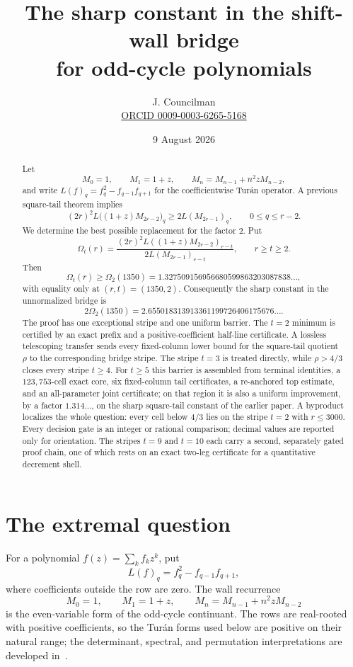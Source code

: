 \documentclass[11pt,a4paper]{article}
\title{\textbf{The sharp constant in the shift-wall bridge\\
for odd-cycle polynomials}}
\author{J. Councilman\\
\small\href{https://orcid.org/0009-0003-6265-5168}{ORCID 0009-0003-6265-5168}}
\date{9 August 2026}
\theoremstyle{plain}
\theoremstyle{remark}
\begin{document}
\maketitle

\begin{abstract}
Let
\[
 M_0=1,\qquad M_1=1+z,\qquad
 M_n=M_{n-1}+n^2zM_{n-2},
\]
and write $L(f)_q=f_q^2-f_{q-1}f_{q+1}$ for the coefficientwise
Tur\'an operator.  A previous square-tail theorem implies
\[
 (2r)^2L\bigl((1+z)M_{2r-2}\bigr)_q\ge 2L(M_{2r-1})_q,
 \qquad 0\le q\le r-2.
\]
We determine the best possible replacement for the factor $2$.  Put
\[
 \Omega_t(r)=
 \frac{(2r)^2L((1+z)M_{2r-2})_{r-t}}
      {2L(M_{2r-1})_{r-t}},\qquad r\ge t\ge2.
\]
Then
\[
 \Omega_t(r)\ge \Omega_2(1350)
 =1.327509156956680599863203087838\ldots,
\]
with equality only at $(r,t)=(1350,2)$.  Consequently the sharp constant in
the unnormalized bridge is
\[
 2\Omega_2(1350)
 =2.655018313913361199726406175676\ldots.
\]
The proof has one exceptional stripe and one uniform barrier.  The $t=2$
minimum is certified by an exact prefix and a positive-coefficient half-line
certificate.  A lossless telescoping transfer sends every fixed-column lower
bound for the square-tail quotient $\rho$ to the corresponding bridge stripe.
The stripe $t=3$ is treated directly, while $\rho>4/3$ closes every stripe
$t\ge4$.  For $t\ge5$ this barrier is assembled from terminal identities, a
$123{,}753$-cell exact core, six fixed-column tail certificates, a re-anchored
top estimate, and an all-parameter joint certificate; on that region it is
also a uniform improvement, by a factor $1.314\ldots$, on the sharp
square-tail constant of the earlier paper.  A byproduct localizes the whole
question: every cell below $4/3$ lies on the stripe $t=2$ with $r\le3000$.
Every decision gate is an integer or rational comparison; decimal values are
reported only for orientation.  The stripes $t=9$ and $t=10$ each carry a
second, separately gated proof chain, one of which rests on an exact two-leg
certificate for a quantitative decrement shell.
\end{abstract}

\section{The extremal question}\label{sec:intro}

For a polynomial $f(z)=\sum_k f_kz^k$, put
\begin{equation}\label{eq:L}
 L(f)_q=f_q^2-f_{q-1}f_{q+1},
\end{equation}
where coefficients outside the row are zero.  The wall recurrence
\begin{equation}\label{eq:wall}
 M_0=1,\qquad M_1=1+z,\qquad
 M_n=M_{n-1}+n^2zM_{n-2}
\end{equation}
is the even-variable form of the odd-cycle continuant.  The rows are
real-rooted with positive coefficients, so the Tur\'an forms used below are
positive on their natural range; the determinant, spectral, and permutation
interpretations are developed in~\cite{squaretail}.
\end{document}
